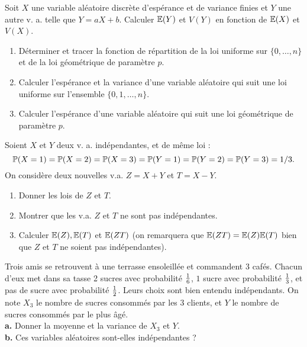 \begin{exo}
Soit $X$ une variable aléatoire discrète d'espérance et de variance finies et
$Y$ une autre v. a. telle que $Y = aX + b$. Calculer $\E({Y})$ et $V({Y})$ en fonction
de $\E(X)$ et $V(X)$.
\end{exo}


\begin{exo} \begin{enumerate}
\item Déterminer et tracer la fonction de répartition de la loi uniforme sur $\{0,\dots,n\}$ et de la loi géométrique de paramètre $p$.
\item Calculer l'espérance et la variance d'une variable aléatoire qui suit une loi uniforme sur l'ensemble $\{0,1,\ldots,n\}$.
\item Calculer l'espérance d'une variable aléatoire qui suit une loi géométrique de paramètre $p$.
\end{enumerate}
\end{exo}


\begin{exo}Soient $X$ et $Y$ deux v. a. indépendantes, et de même loi :
$$\P(X=1)=\P(X=2)=\P(X=3)=\P(Y=1)=\P(Y=2)=\P(Y=3)=1/3.$$ 
On considère deux nouvelles v.a. $Z=X+Y$ et $T=X-Y$.

\begin{enumerate}
\item Donner les lois de $Z$ et $T$.
\item Montrer que les v.a. $Z$ et $T$ ne sont pas indépendantes.
\item Calculer $\E(Z),\E(T)$ et $\E(ZT)$ (on remarquera que $\E(ZT)=
\E(Z)\E(T)$ bien que $Z$ et $T$ ne soient pas indépendantes).
\end{enumerate}
\end{exo}


\begin{exo} 
Trois amis se retrouvent à une terrasse ensoleillée et commandent 3 cafés. Chacun d'eux met dans sa tasse 2 sucres avec probabilité ${1\over 6}$, $1$ sucre avec probabilité ${1\over 3}$, et pas de sucre avec probabilité ${1\over 2}$. Leurs choix sont bien entendu indépendants. On note $X_3$ le nombre de sucres consommés
par les 3 clients, et $Y$ le nombre de sucres consommés par le plus âgé.\\
\noindent
\textbf{a.} Donner la moyenne et la variance de $X_3$ et $Y$. \\ 
\noindent
\textbf{b.} Ces variables aléatoires sont-elles indépendantes ?
\end{exo}


